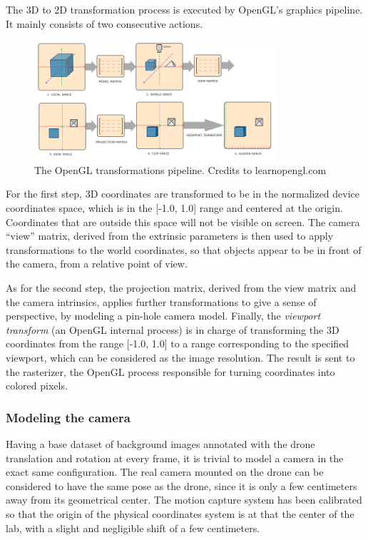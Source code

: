 The 3D to 2D transformation process is executed by OpenGL's graphics pipeline.
It mainly consists of two consecutive actions.

\begin{figure}[h]
	\center
	\includegraphics[width=0.8\textwidth]{figure/pipeline.png}
	\caption[OpenGL transformations pipeline]{The OpenGL transformations
	pipeline. Credits to learnopengl.com~\cite{LearnOpenGL} }
	\label{fig:openglpipeline}
\end{figure}

For the first step, 3D coordinates are transformed to be in the normalized
device coordinates space, which is in the [-1.0, 1.0] range and centered at the
origin. Coordinates that are outside this space will not be visible on screen.
The camera ``view'' matrix, derived from the extrinsic parameters is then used
to apply transformations to the world coordinates, so that objects appear to be
in front of the camera, from a relative point of view.

As for the second step, the projection matrix, derived from the view matrix and
the camera intrinsics, applies further transformations to give a sense of
perspective, by modeling a pin-hole camera model. Finally, the \emph{viewport
transform} (an OpenGL internal process) is in charge of transforming the 3D
coordinates from the range [-1.0, 1.0] to a range corresponding to the
specified viewport, which can be considered as the image resolution. The result
is sent to the rasterizer, the OpenGL process responsible for turning
coordinates into colored pixels.


	\subsubsection{Modeling the camera}

Having a base dataset of background images annotated with the drone translation
and rotation at every frame, it is trivial to model a camera in the exact same
configuration. The real camera mounted on the drone can be considered to have
the same pose as the drone, since it is only a few centimeters away from its
geometrical center. The motion capture system has been calibrated so that the
origin of the physical coordinates system is at that the center of the lab,
with a slight and negligible shift of a few centimeters.\\

